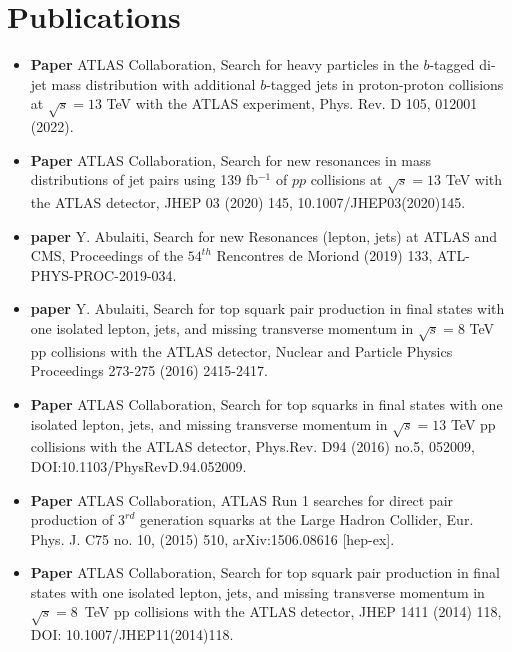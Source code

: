 \newpage

\section{Publications}

\begin{cventries}
    
\begin{itemize}
	\item \textbf{Paper} ATLAS Collaboration, Search for heavy particles in the $b$-tagged di-jet mass distribution with additional $b$-tagged jets in proton-proton collisions at $\sqrt{s}=13$ TeV with the ATLAS experiment, Phys. Rev. D 105, 012001 (2022).
	
	\item \textbf{Paper} ATLAS Collaboration, Search for new resonances in mass distributions of jet pairs using 139 fb$^{-1}$ of $pp$ collisions at $\sqrt{s}=13$ TeV with the ATLAS detector, JHEP 03 (2020) 145, 10.1007/JHEP03(2020)145.
	
	\item \textbf{paper} Y. Abulaiti, Search for new Resonances (lepton, jets) at ATLAS and CMS, Proceedings of the $54^{th}$ Rencontres de Moriond (2019) 133,  ATL-PHYS-PROC-2019-034.
	
	\item \textbf{paper} Y. Abulaiti, Search for top squark pair production in final states with one isolated lepton, jets, and missing transverse momentum in $\sqrt{s}=8$ TeV pp collisions with the {ATLAS} detector, Nuclear and Particle Physics Proceedings 273-275 (2016) 2415-2417.
	
	\item \textbf{Paper } ATLAS Collaboration, Search for top squarks in final states with one isolated lepton, jets, and missing transverse momentum in $\sqrt{s} = 13$ TeV pp collisions with the ATLAS detector, Phys.Rev. D94 (2016) no.5, 052009, DOI:10.1103/PhysRevD.94.052009.
	
	\item \textbf{Paper } ATLAS Collaboration, ATLAS Run 1 searches for direct pair production of $3^{rd}$ generation squarks at the Large Hadron Collider, Eur. Phys. J. C75 no. 10, (2015) 510, arXiv:1506.08616 [hep-ex].
	
	\item \textbf{Paper } ATLAS Collaboration, Search for top squark pair production in final states with one isolated lepton, jets,  and missing transverse momentum in $\sqrt{s}=8$~TeV pp collisions with the ATLAS detector, JHEP 1411 (2014) 118, DOI: 10.1007/JHEP11(2014)118.
	

\end{itemize}
\end{cventries}
